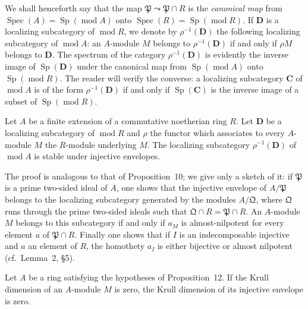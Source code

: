 We shall henceforth say that the map
$\mathfrak{P}\leadsto\mathfrak{P}\cap R$ is the \emph{canonical map}
from $\operatorname{Spec}(A)=\operatorname{Sp}(\operatorname{mod}A)$
onto $\operatorname{Spec}(R)=\operatorname{Sp}(\operatorname{mod}R)$.
If $\mathbf{D}$ is a localizing subcategory of $\operatorname{mod}R$,
we denote by $\rho^{-1}(\mathbf{D})$ the following localizing
subcategory of $\operatorname{mod}A$: an $A$-module $M$ belongs to
$\rho^{-1}(\mathbf{D})$ if and only if $\rho M$ belongs to
$\mathbf{D}$. The spectrum of the category $\rho^{-1}(\mathbf{D})$ is
evidently the inverse image of $\operatorname{Sp}(\mathbf{D})$ under
the canonical map from $\operatorname{Sp}(\operatorname{mod}A)$ onto
$\operatorname{Sp}(\operatorname{mod}R)$. The reader will verify the
converse: a localizing subcategory $\mathbf{C}$ of $\operatorname{mod}A$
is of the form $\rho^{-1}(\mathbf{D})$ if and only if
$\operatorname{Sp}(\mathbf{C})$ is the inverse image of a subset of
$\operatorname{Sp}(\operatorname{mod}R)$.

\begin{proposition}
Let $A$ be a finite extension of a commutative noetherian ring $R$.
Let $\mathbf{D}$ be a localizing subcategory of $\operatorname{mod}R$
and $\rho$ the functor which associates to every $A$-module $M$ the
$R$-module underlying $M$. The localizing subcategory
$\rho^{-1}(\mathbf{D})$ of $\operatorname{mod}A$ is stable under
injective envelopes.
\end{proposition}

The proof is analogous to that of Proposition~10; we give only a
sketch of it: if $\mathfrak{P}$ is a prime two-sided ideal of $A$, one
shows that the injective envelope of $A/\mathfrak{P}$ belongs to the
localizing subcategory generated by the modules $A/\mathfrak{Q}$,
where $\mathfrak{Q}$ runs through the prime two-sided ideals such that
$\mathfrak{Q}\cap R=\mathfrak{P}\cap R$. An $A$-module $M$ belongs to
this subcategory if and only if $a_M$ is almost-nilpotent for every
element $a$ of $\mathfrak{P}\cap R$. Finally one shows that if $I$ is
an indecomposable injective and $a$ an element of $R$, the homothety
$a_I$ is either bijective or almost nilpotent (cf.~Lemma~2, \S5).

\begin{unnumberedcorollary}
Let $A$ be a ring satisfying the hypotheses of Proposition~12. If the
Krull dimension of an $A$-module $M$ is zero, the Krull dimension of
its injective envelope is zero.
\end{unnumberedcorollary}

